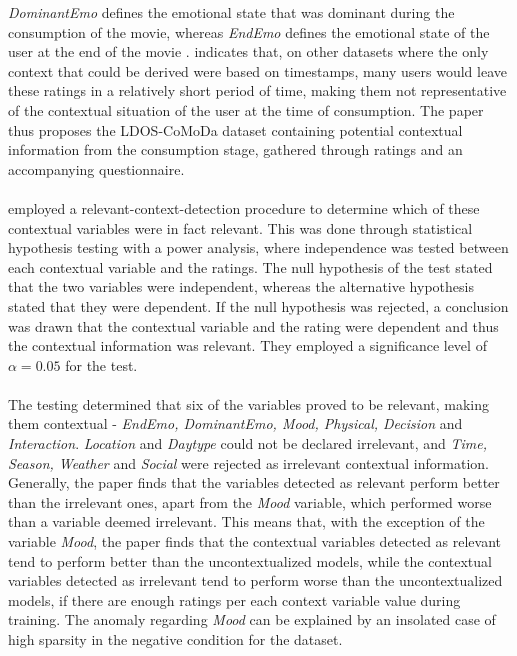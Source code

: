\textit{DominantEmo} defines the emotional state that was dominant during the consumption of the movie, whereas \textit{EndEmo} defines the emotional state of the user at the end of the movie \cite{COMODA2013}.
\cite{COMODA2013} indicates that, on other datasets where the only context that could be derived were based on timestamps, many users would leave these ratings in a relatively short period of time, making them not representative of the contextual situation of the user at the time of consumption.
The paper thus proposes the LDOS-CoMoDa dataset containing potential contextual information from the consumption stage, gathered through ratings and an accompanying questionnaire.
\\\\
\cite{COMODA2013} employed a relevant-context-detection procedure to determine which of these contextual variables were in fact relevant.
This was done through statistical hypothesis testing with a power analysis, where independence was tested between each contextual variable and the ratings.
The null hypothesis of the test stated that the two variables were independent, whereas the alternative hypothesis stated that they were dependent.
If the null hypothesis was rejected, a conclusion was drawn that the contextual variable and the rating were dependent and thus the contextual information was relevant.
They employed a significance level of $\alpha = 0.05$ for the test.
\\\\
The testing determined that six of the variables proved to be relevant, making them contextual - \textit{EndEmo, DominantEmo, Mood, Physical, Decision} and \textit{Interaction}.
\textit{Location} and \textit{Daytype} could not be declared irrelevant, and \textit{Time, Season, Weather} and \textit{Social} were rejected as irrelevant contextual information.
Generally, the paper finds that the variables detected as relevant perform better than the irrelevant ones, apart from the \textit{Mood} variable, which performed worse than a variable deemed irrelevant.
This means that, with the exception of the variable \textit{Mood}, the paper finds that the contextual variables detected as relevant tend to perform better than the uncontextualized models, while the contextual variables detected as irrelevant tend to perform worse than the uncontextualized models, if there are enough ratings per each context variable value during training.
The anomaly regarding \textit{Mood} can be explained by an insolated case of high sparsity in the negative condition for the dataset.

